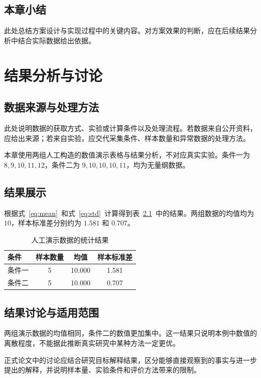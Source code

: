 \documentclass[bachelor]{njupthesis}
\begin{document}
\section{本章小结}
此处总结方案设计与实现过程中的关键内容。对方案效果的判断，应在后续结果分析中结合实际数据给出依据。

\chapter{结果分析与讨论}
\label{chap:results}

\section{数据来源与处理方法}
此处说明数据的获取方式、实验或计算条件以及处理流程。若数据来自公开资料，应给出来源；若来自实验，应交代采集条件、样本数量和异常数据的处理方法。

本章使用两组人工构造的数值演示表格与结果分析，不对应真实实验。条件一为 $8,9,10,11,12$，条件二为 $9,10,10,10,11$，均为无量纲数据。

\section{结果展示}
根据式~\eqref{eq:mean}~和式~\eqref{eq:std}~计算得到表~\ref{tab:results}~中的结果。两组数据的均值均为 $10$，样本标准差分别约为 $1.581$ 和 $0.707$。

\begin{table}[htbp]
  \centering
  \caption{人工演示数据的统计结果}
  \label{tab:results}
  \begin{tabular}{lccc}
    \toprule
    条件 & 样本数量 & 均值 & 样本标准差 \\
    \midrule
    条件一 & 5 & 10.000 & 1.581 \\
    条件二 & 5 & 10.000 & 0.707 \\
    \bottomrule
  \end{tabular}
\end{table}

\section{结果讨论与适用范围}
两组演示数据的均值相同，条件二的数值更加集中。这一结果只说明本例中数值的离散程度，不能据此推断真实研究中某种方法一定更优。

正式论文中的讨论应结合研究目标解释结果，区分能够直接观察到的事实与进一步提出的解释，并说明样本量、实验条件和评价方法带来的限制。
\end{document}
